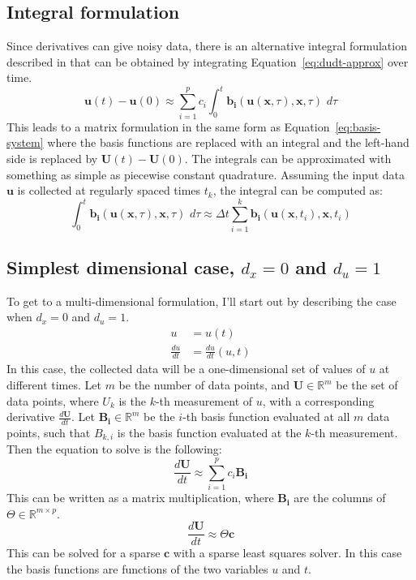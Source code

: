 \documentclass{article}
\let\vec\mathbf
\def\real{\mathbb{R}}
\begin{document}
\subsection{Integral formulation}

Since derivatives can give noisy data, there is an alternative integral
formulation described in \cite{schaeffer2017integral} that can be obtained by integrating
Equation~\ref{eq:dudt-approx} over time.
\begin{equation}
\vec{u}(t) - \vec{u}(0) \approx \sum_{i=1}^p c_i \int_0^t \vec{b_i}(\vec{u}(\vec{x},\tau),\vec{x},\tau) \,\, d\tau
\end{equation}
This leads to a matrix formulation in the same form as
Equation~\ref{eq:basis-system} where the basis functions are replaced with an
integral and the left-hand side is replaced by $\vec{U}(t) - \vec{U}(0)$.
The integrals can be approximated with something as simple as piecewise constant quadrature.
Assuming the input data $\vec{u}$ is collected at regularly spaced times $t_k$, the integral can be computed as:
\begin{equation}
\int_0^t \vec{b_i}(\vec{u}(\vec{x},\tau),\vec{x},\tau) \,\, d\tau \approx \Delta t \sum_{i=1}^k \vec{b_i}(\vec{u}(\vec{x},t_i),\vec{x},t_i)
\end{equation}

\subsection{Simplest dimensional case, $d_x = 0$ and $d_u = 1$} \label{section:simplest}

To get to a multi-dimensional formulation, I'll start out by describing the case when $d_x = 0$ and $d_u = 1$.
\begin{align*}
u &= u(t) \\
\frac{du}{dt} &= \frac{du}{dt}(u, t)
\end{align*}
In this case, the collected data will be a one-dimensional set of values of $u$
at different times. Let $m$ be the number of data points, and $\vec{U} \in
\real^m$ be the set of data points, where $U_k$ is the $k$-th measurement of
$u$, with a corresponding derivative $\frac{d\vec{U}}{dt}$. Let $\vec{B_i} \in
\real^m$ be the $i$-th basis function evaluated at all $m$ data points, such
that $B_{k,i}$ is the basis function evaluated at the $k$-th measurement.
Then the equation to solve is the following:
\begin{equation*}
\frac{d\vec{U}}{dt} \approx \sum_{i=1}^p c_i \vec{B_i}
\end{equation*}
This can be written as a matrix multiplication, where $\vec{B_i}$ are the
columns of $\Theta \in \real^{m \times p}$.
\begin{equation}
\frac{d\vec{U}}{dt} \approx \Theta \vec{c}
\end{equation}
This can be solved for a sparse $\vec{c}$ with a sparse least squares solver. In
this case the basis functions are functions of the two variables $u$ and $t$.
\end{document}
